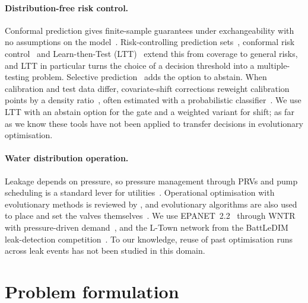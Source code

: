 \documentclass[11pt]{article}
\begin{document}
\paragraph{Distribution-free risk control.}
Conformal prediction gives finite-sample guarantees under exchangeability with no assumptions on the
model~\citep{vovk2005alrw}. Risk-controlling prediction sets~\citep{bates2021rcps}, conformal risk
control~\citep{angelopoulos2024crc} and Learn-then-Test (LTT)~\citep{angelopoulos2025ltt} extend this from coverage
to general risks, and LTT in particular turns the choice of a decision threshold into a multiple-testing problem.
Selective prediction~\citep{geifman2017selective} adds the option to abstain. When calibration and test data differ,
covariate-shift corrections reweight calibration points by a density ratio~\citep{tibshirani2019covariate}, often
estimated with a probabilistic classifier~\citep{bickel2009discriminative}. We use LTT with an abstain option for the
gate and a weighted variant for shift; as far as we know these tools have not been applied to transfer decisions
in evolutionary optimisation.

\paragraph{Water distribution operation.}
Leakage depends on pressure, so pressure management through PRVs and pump scheduling is a standard lever for
utilities~\citep{vairavamoorthy1998leakage,araujo2006pressure}. Operational optimisation with evolutionary methods is
reviewed by \citet{malajetmarova2017lost}, and evolutionary algorithms are also used to place and set the valves
themselves~\citep{creaco2018comparison}.
We use EPANET~2.2~\citep{rossman2020epanet} through WNTR~\citep{klise2017wntr} with pressure-driven demand~\citep{wagner1988reliability}, and the
L-Town network from the BattLeDIM leak-detection competition~\citep{vrachimis2022battledim}. To our knowledge, reuse of
past optimisation runs across leak events has not been studied in this domain.

\section{Problem formulation}\label{sec:problem}
\end{document}
